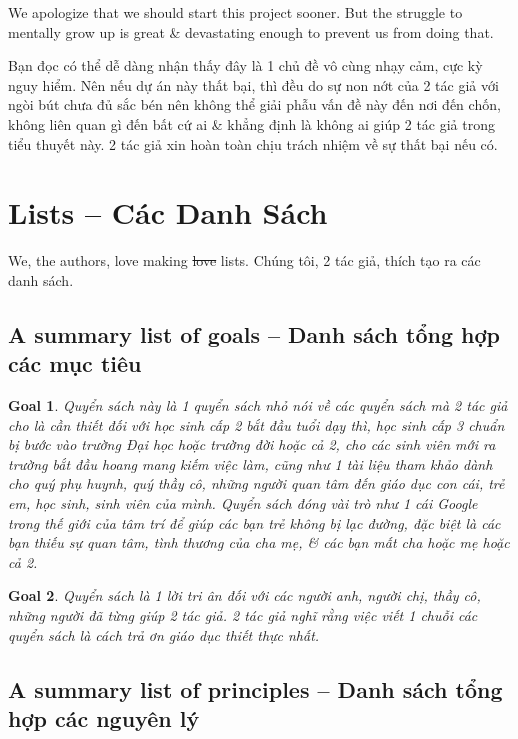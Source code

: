 \documentclass[12pt]{article}
\newtheorem{goal}{Goal}
\begin{document}
We apologize that we should start this project sooner. But the struggle to mentally grow up is great \& devastating enough to prevent us from doing that.

Bạn đọc có thể dễ dàng nhận thấy đây là 1 chủ đề vô cùng nhạy cảm, cực kỳ nguy hiểm. Nên nếu dự án này thất bại, thì đều do sự non nớt của 2 tác giả với ngòi bút chưa đủ sắc bén nên không thể giải phẫu vấn đề này đến nơi đến chốn, không liên quan gì đến bất cứ ai \& khẳng định là không ai giúp 2 tác giả trong tiểu thuyết này. 2 tác giả xin hoàn toàn chịu trách nhiệm về sự thất bại nếu có.


\section{Lists -- Các Danh Sách}
We, the authors, love making \st{love} lists. Chúng tôi, 2 tác giả, thích tạo ra các danh sách.

\subsection{A summary list of goals -- Danh sách tổng hợp các mục tiêu}

\begin{goal}
	Quyển sách này là 1 quyển sách nhỏ nói về các quyển sách mà 2 tác giả cho là cần thiết đối với học sinh cấp 2 bắt đầu tuổi dạy thì, học sinh cấp 3 chuẩn bị bước vào trường Đại học hoặc trường đời hoặc cả 2, cho các sinh viên mới ra trường bắt đầu hoang mang kiếm việc làm, cũng như 1 tài liệu tham khảo dành cho quý phụ huynh, quý thầy cô, những người quan tâm đến giáo dục con cái, trẻ em, học sinh, sinh viên của mình. Quyển sách đóng vài trò như 1 cái Google trong thế giới của tâm trí để giúp các bạn trẻ không bị lạc đường, đặc biệt là các bạn thiếu sự quan tâm, tình thương của cha mẹ, \& các bạn mất cha hoặc mẹ hoặc cả 2.
\end{goal}

\begin{goal}
	Quyển sách là 1 lời tri ân đối với các người anh, người chị, thầy cô, những người đã từng giúp 2 tác giả. 2 tác giả nghĩ rằng việc viết 1 chuỗi các quyển sách là cách trả ơn giáo dục thiết thực nhất.
\end{goal}

\subsection{A summary list of principles -- Danh sách tổng hợp các nguyên lý}
\end{document}
